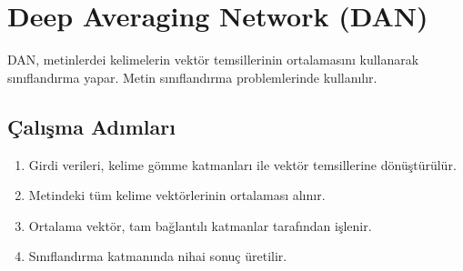 \section{Deep Averaging Network (DAN)}
DAN, metinlerdei kelimelerin vektör temsillerinin ortalamasını kullanarak sınıflandırma yapar. Metin sınıflandırma problemlerinde kullanılır. 

\subsection{Çalışma Adımları}
\begin{enumerate}
	\item Girdi verileri, kelime gömme katmanları ile vektör temsillerine dönüştürülür.
	\item Metindeki tüm kelime vektörlerinin ortalaması alınır.
	\item Ortalama vektör, tam bağlantılı katmanlar tarafından işlenir.
	\item Sınıflandırma katmanında nihai sonuç üretilir.
\end{enumerate}

\newpage